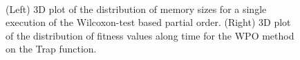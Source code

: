 \documentclass{llncs}
\begin{document}
\begin{figure}[ht!b]
\centering
{}
~
\caption{(Left) 3D plot of the distribution of memory sizes for a single
execution of the Wilcoxon-test based partial order. (Right)
3D plot of the distribution of fitness values along time for the WPO
method on the Trap function. \label{fig:initial}}
\end{figure}
\end{document}
